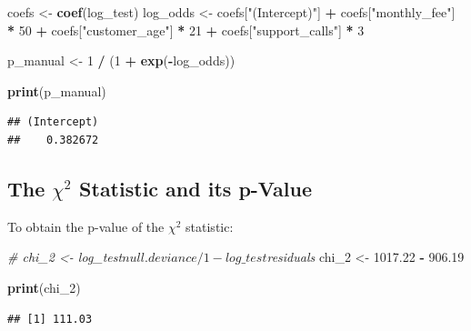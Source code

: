 \documentclass[
]{article}
\newenvironment{Shaded}{\begin{snugshade}}{\end{snugshade}}
\newcommand{\AttributeTok}[1]{\textcolor[rgb]{0.13,0.29,0.53}{#1}}
\newcommand{\CommentTok}[1]{\textcolor[rgb]{0.56,0.35,0.01}{\textit{#1}}}
\newcommand{\DecValTok}[1]{\textcolor[rgb]{0.00,0.00,0.81}{#1}}
\newcommand{\FloatTok}[1]{\textcolor[rgb]{0.00,0.00,0.81}{#1}}
\newcommand{\FunctionTok}[1]{\textcolor[rgb]{0.13,0.29,0.53}{\textbf{#1}}}
\newcommand{\NormalTok}[1]{#1}
\newcommand{\OtherTok}[1]{\textcolor[rgb]{0.56,0.35,0.01}{#1}}
\newcommand{\SpecialCharTok}[1]{\textcolor[rgb]{0.81,0.36,0.00}{\textbf{#1}}}
\newcommand{\StringTok}[1]{\textcolor[rgb]{0.31,0.60,0.02}{#1}}
\begin{document}
\begin{Shaded}
\begin{Highlighting}[]
\NormalTok{coefs }\OtherTok{\textless{}{-}} \FunctionTok{coef}\NormalTok{(log\_test)}
\NormalTok{log\_odds   }\OtherTok{\textless{}{-}}\NormalTok{ coefs[}\StringTok{"(Intercept)"}\NormalTok{] }\SpecialCharTok{+} 
\NormalTok{  coefs[}\StringTok{"monthly\_fee"}\NormalTok{] }\SpecialCharTok{*} \DecValTok{50} \SpecialCharTok{+}
\NormalTok{  coefs[}\StringTok{"customer\_age"}\NormalTok{] }\SpecialCharTok{*} \DecValTok{21} \SpecialCharTok{+}
\NormalTok{  coefs[}\StringTok{"support\_calls"}\NormalTok{] }\SpecialCharTok{*} \DecValTok{3}

\NormalTok{p\_manual }\OtherTok{\textless{}{-}} \DecValTok{1} \SpecialCharTok{/}\NormalTok{ (}\DecValTok{1} \SpecialCharTok{+} \FunctionTok{exp}\NormalTok{(}\SpecialCharTok{{-}}\NormalTok{log\_odds))}

\FunctionTok{print}\NormalTok{(p\_manual)}
\end{Highlighting}
\end{Shaded}

\begin{verbatim}
## (Intercept) 
##    0.382672
\end{verbatim}

\subsection{\texorpdfstring{The \(\chi^2\) Statistic and its
p-Value}{The \textbackslash chi\^{}2 Statistic and its p-Value}}\label{the-chi2-statistic-and-its-p-value}

To obtain the p-value of the \(\chi^2\) statistic:

\begin{Shaded}
\begin{Highlighting}[]
\CommentTok{\# chi\_2 \textless{}{-} log\_test$null.deviance/1 {-} log\_test$residuals}
\NormalTok{chi\_2 }\OtherTok{\textless{}{-}} \FloatTok{1017.22} \SpecialCharTok{{-}} \FloatTok{906.19}

\FunctionTok{print}\NormalTok{(chi\_2)}
\end{Highlighting}
\end{Shaded}

\begin{verbatim}
## [1] 111.03
\end{verbatim}

\begin{Shaded}
\end{Shaded}
\end{document}
